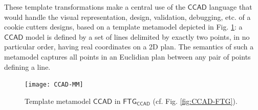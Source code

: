 These template transformations make a central use of the $\mathsf{CCAD}$ 
language that would handle the visual representation, design, validation, 
debugging, etc. of a cookie cutters designs, based on a template metamodel 
depicted in Fig. \ref{fig:CCAD-MM}: a $\mathsf{CCAD}$ model is defined by a set 
of lines delimited by exactly two points, in no particular order, having real 
coordinates on a 2D plan. The semantics of such a metamodel captures all points 
in an Euclidian plan between any pair of points defining a line.

\begin{figure}[t]
\centering
\texttt{[image: CCAD-MM]}
\caption{Template metamodel $\mathsf{CCAD}$ in $\mathsf{FTG_{CCAD}}$ 
(cf. Fig. \ref{fig:CCAD-FTG}).}
\label{fig:CCAD-MM}%
\end{figure}



